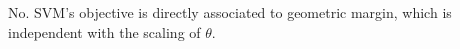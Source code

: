\begin{answer}
No. SVM's objective is directly associated to geometric margin, which is independent with the scaling of $\theta$.
\end{answer}
